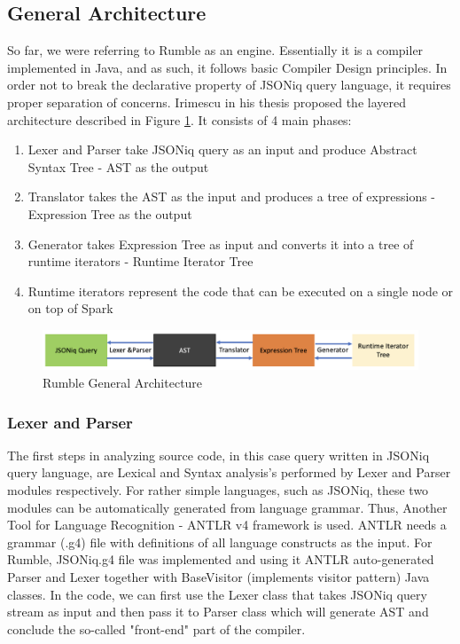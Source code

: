 \subsection{General Architecture}
\label{sec:RumbleArchitecture}
So far, we were referring to Rumble as an engine. Essentially it is a compiler implemented in Java, and as such, it follows basic Compiler Design principles. In order not to break the declarative property of JSONiq query language, it requires proper separation of concerns. Irimescu in his thesis \cite{RumbleThesis} proposed the layered architecture described in Figure \ref{fig:Rumble_General_Architecture}. It consists of 4 main phases:
\begin{enumerate}
	\item Lexer and Parser take JSONiq query as an input and produce Abstract Syntax Tree - AST as the output 
	\item Translator takes the AST as the input and produces a tree of expressions - Expression Tree as the output
	\item Generator takes Expression Tree as input and converts it into a tree of runtime iterators - Runtime Iterator Tree
	\item Runtime iterators represent the code that can be executed on a single node or on top of Spark
\end{enumerate} 

\begin{figure}[h!]
	\includegraphics[width=\linewidth]{parsing_architecture.png}
	\caption{Rumble General Architecture}
	\label{fig:Rumble_General_Architecture}
\end{figure}

\subsubsection{Lexer and Parser}
\label{sec:RumbleLexerParser}
The first steps in analyzing source code, in this case query written in JSONiq query language, are Lexical and Syntax analysis's performed by Lexer and Parser modules respectively. For rather simple languages, such as JSONiq, these two modules can be automatically generated from language grammar. Thus, Another Tool for Language Recognition - ANTLR v4 framework \cite{ANTLR} is used. ANTLR needs a grammar (.g4) file with definitions of all language constructs as the input. For Rumble, JSONiq.g4 file was implemented and using it ANTLR auto-generated Parser and Lexer together with BaseVisitor (implements visitor pattern) Java classes. In the code, we can first use the Lexer class that takes JSONiq query stream as input and then pass it to Parser class which will generate AST and conclude the so-called "front-end" part of the compiler.

